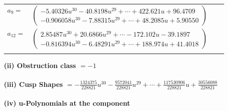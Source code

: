 \documentclass[1p]{elsarticle_modified}
\theoremstyle{definition}
\begin{document}
\begin{tabular}{m{7pt} m{180pt} m{7pt} m{180pt} }
\flushright $a_{9}=$&$\begin{pmatrix}-5.40326 u^{30}-40.8198 u^{29}+\cdots+422.621 u+96.4709\\-0.906058 u^{30}-7.88315 u^{29}+\cdots+48.2085 u+5.90550\end{pmatrix}$ \\
\flushright $a_{12}=$&$\begin{pmatrix}2.85487 u^{30}+20.6866 u^{29}+\cdots-172.102 u-39.1897\\-0.816394 u^{30}-6.48291 u^{29}+\cdots+188.974 u+41.4018\end{pmatrix}$\\&\end{tabular}
\flushleft \textbf{(ii) Obstruction class $= -1$}\\~\\
\flushleft \textbf{(iii) Cusp Shapes $= -\frac{1324375}{228821} u^{30}-\frac{9572041}{228821} u^{29}+\cdots+\frac{117530906}{228821} u+\frac{30556088}{228821}$}\\~\\
\newpage\renewcommand{\arraystretch}{1}
\flushleft \textbf{(iv) u-Polynomials at the component}\newline \\
\end{document}
